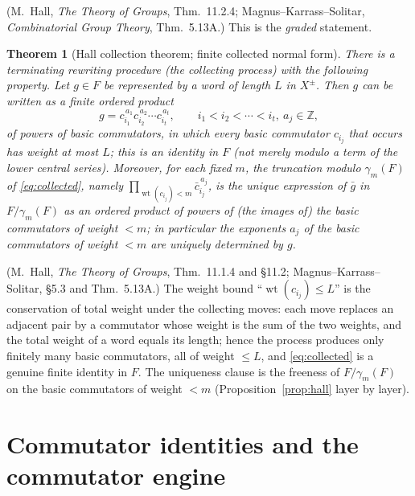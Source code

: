 \documentclass{amsart}
\newtheorem{theorem}{Theorem}
\theoremstyle{definition}
\theoremstyle{remark}
\begin{document}
\noindent(M.~Hall, \emph{The Theory of Groups}, Thm.~11.2.4;
Magnus--Karrass--Solitar, \emph{Combinatorial Group Theory}, Thm.~5.13A.) This is
the \emph{graded} statement.

\begin{theorem}[Hall collection theorem; finite collected normal form]\label{thm:collect}
There is a terminating rewriting procedure (the collecting process) with the
following property. Let $g\in F$ be represented by a word of length $L$ in
$X^{\pm}$. Then $g$ can be written as a \emph{finite} ordered product
\begin{equation}\label{eq:collected}
g=c_{i_1}^{\,a_1}c_{i_2}^{\,a_2}\cdots c_{i_t}^{\,a_t},
\qquad i_1<i_2<\cdots<i_t,\ a_j\in\mathbb Z,
\end{equation}
of powers of basic commutators, in which every basic commutator $c_{i_j}$ that
occurs has weight at most $L$; this is an \emph{identity in $F$} (not merely modulo
a term of the lower central series). Moreover, for each fixed $m$, the truncation
modulo $\gamma_m(F)$ of \eqref{eq:collected}, namely
$\prod_{\operatorname{wt}(c_{i_j})<m}\bar c_{i_j}^{\,a_j}$, is the
\emph{unique} expression of $\bar g$ in $F/\gamma_m(F)$ as an ordered product of
powers of (the images of) the basic commutators of weight $<m$; in particular the
exponents $a_j$ of the basic commutators of weight $<m$ are uniquely determined by
$g$.
\end{theorem}

\noindent(M.~Hall, \emph{The Theory of Groups}, Thm.~11.1.4 and \S11.2;
Magnus--Karrass--Solitar, \S5.3 and Thm.~5.13A.) The weight bound
``$\operatorname{wt}(c_{i_j})\le L$'' is the conservation of total weight under the
collecting moves: each move replaces an adjacent pair by a commutator whose weight
is the sum of the two weights, and the total weight of a word equals its length;
hence the process produces only finitely many basic commutators, all of weight
$\le L$, and \eqref{eq:collected} is a genuine finite identity in $F$. The
uniqueness clause is the freeness of $F/\gamma_m(F)$ on the basic commutators of
weight $<m$ (Proposition~\ref{prop:hall} layer by layer).

\section{Commutator identities and the commutator engine}\label{sec:engine}
\end{document}
